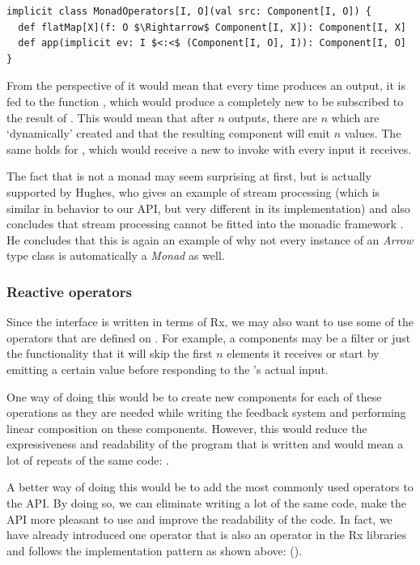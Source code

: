\begin{lstlisting}[style=InlineScalaStyle]
implicit class MonadOperators[I, O](val src: Component[I, O]) {
  def flatMap[X](f: O $\Rightarrow$ Component[I, X]): Component[I, X]
  def app(implicit ev: I $<:<$ (Component[I, O], I)): Component[I, O]
}
\end{lstlisting}

From the perspective of  it would mean that every time  produces an output, it is fed to the function , which would produce a completely new \comp to be subscribed to the result of . This would mean that after $n$ outputs, there are $n$ \comp which are `dynamically' created and that the resulting component will emit $n$ values. The same holds for , which would receive a new \comp to invoke with every input it receives.

The fact that \comp is not a monad may seem surprising at first, but is actually supported by Hughes, who gives an example of stream processing (which is similar in behavior to our API, but very different in its implementation) and also concludes that stream processing cannot be fitted into the monadic framework \cite{hughes2000-arrows}. He concludes that this is again an example of why not every instance of an \textit{Arrow} type class is automatically a \textit{Monad} as well.

\subsubsection{Reactive operators}
Since the \comp interface is written in terms of Rx, we may also want to use some of the operators that are defined on \obs. For example, a components may be a filter or just the functionality that it will skip the first $n$ elements it receives or start by emitting a certain value before responding to the \comp's actual input.

One way of doing this would be to create new components for each of these operations as they are needed while writing the feedback system and performing linear composition on these components. However, this would reduce the expressiveness and readability of the program that is written and would mean a lot of repeats of the same code: .

A better way of doing this would be to add the most commonly used operators to the \comp API. By doing so, we can eliminate writing a lot of the same code, make the API more pleasant to use and improve the readability of the code. In fact, we have already introduced one operator that is also an operator in the Rx libraries and follows the implementation pattern as shown above:  ().

